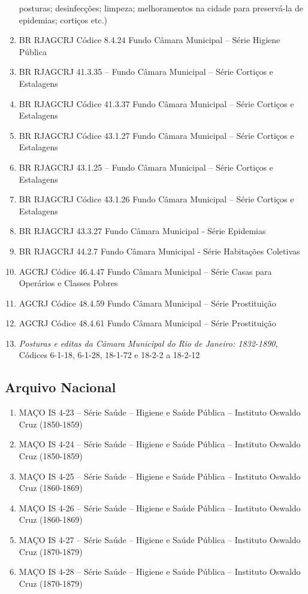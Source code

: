 \begin{enumerate}
  posturas; desinfecções; limpeza; melhoramentos na cidade para
  preservá-la de epidemias; cortiços etc.)
\item
  BR RJAGCRJ Códice 8.4.24 Fundo Câmara Municipal -- Série Higiene
  Pública
\item
  BR RJAGCRJ 41.3.35 -- Fundo Câmara Municipal -- Série Cortiços e
  Estalagens
\item
  BR RJAGCRJ Códice 41.3.37 Fundo Câmara Municipal -- Série Cortiços e
  Estalagens
\item
  BR RJAGCRJ Códice 43.1.27 Fundo Câmara Municipal -- Série Cortiços e
  Estalagens
\item
  BR RJAGCRJ 43.1.25 -- Fundo Câmara Municipal -- Série Cortiços e
  Estalagens
\item
  BR RJAGCRJ Códice 43.1.26 Fundo Câmara Municipal -- Série Cortiços e
  Estalagens
\item
  BR RJAGCRJ 43.3.27 Fundo Câmara Municipal - Série Epidemias
\item
  BR RJAGCRJ 44.2.7 Fundo Câmara Municipal - Série Habitações Coletivas
\item
  AGCRJ Códice 46.4.47 Fundo Câmara Municipal -- Série Casas para
  Operários e Classes Pobres
\item
  AGCRJ Códice 48.4.59 Fundo Câmara Municipal -- Série Prostituição
\item
  AGCRJ Códice 48.4.61 Fundo Câmara Municipal -- Série Prostituição
\item
  \emph{Posturas e editas da Câmara Municipal do Rio de Janeiro:
  1832-1890,} Códices 6-1-18, 6-1-28, 18-1-72 e 18-2-2 a 18-2-12
\end{enumerate}

\hypertarget{arquivo-nacional}{%
\subsection{Arquivo Nacional}\label{arquivo-nacional}}

\begin{enumerate}
\def\labelenumi{\arabic{enumi}.}
\item
  MAÇO IS 4-23 -- Série Saúde -- Higiene e Saúde Pública -- Instituto
  Oswaldo Cruz (1850-1859)
\item
  MAÇO IS 4-24 -- Série Saúde -- Higiene e Saúde Pública -- Instituto
  Oswaldo Cruz (1850-1859)
\item
  MAÇO IS 4-25 -- Série Saúde -- Higiene e Saúde Pública -- Instituto
  Oswaldo Cruz (1860-1869)
\item
  MAÇO IS 4-26 -- Série Saúde -- Higiene e Saúde Pública -- Instituto
  Oswaldo Cruz (1860-1869)
\item
  MAÇO IS 4-27 -- Série Saúde -- Higiene e Saúde Pública -- Instituto
  Oswaldo Cruz (1870-1879)
\item
  MAÇO IS 4-28 -- Série Saúde -- Higiene e Saúde Pública -- Instituto
  Oswaldo Cruz (1870-1879)
\end{enumerate}

